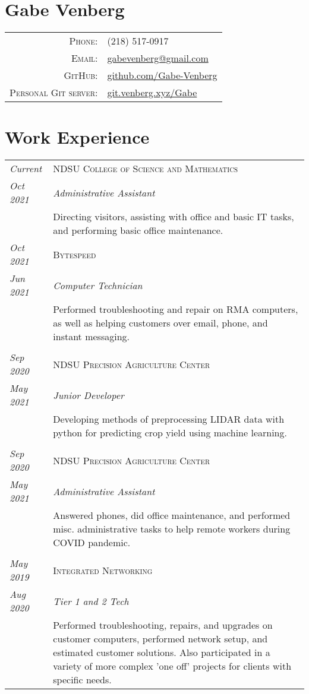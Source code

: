 \documentclass[letterpaper,10pt]{article}
\begin{document}
\pagestyle{empty}%
\section*{Gabe Venberg}
	\begin{tabular}{rl}
	\textsc{Phone:} & (218) 517-0917\\
	\textsc{Email:} & \href{mailto:gabevenberg@gmail.com}{gabevenberg@gmail.com}\\
	\textsc{GitHub:} & \href{https://github.com/Gabe-Venberg}{github.com/Gabe-Venberg}\\
	\textsc{Personal Git server:} & \href{https://git.venberg.xyz/Gabe}{git.venberg.xyz/Gabe}\\
	\end{tabular}
\section*{Work Experience}
	\begin{tabular}{R{2cm}|p{14cm}}
	\textsl{Current}	&\textsc{NDSU College of Science and Mathematics}\\
	\textsl{Oct 2021}	&\emph{Administrative Assistant}\\
	& Directing visitors, assisting with office and basic IT tasks, and performing basic office maintenance.\\
	\textsl{Oct 2021}	& \textsc{Bytespeed}\\
	\textsl{Jun 2021}	& \emph{Computer Technician}\\
	& Performed troubleshooting and repair on RMA computers, as well as helping customers over email, phone, and instant messaging.\\
	\\
	\textsl{Sep 2020}	& \textsc{NDSU Precision Agriculture Center}\\
	\textsl{May 2021}	& \emph{Junior Developer}\\
	& Developing methods of preprocessing LIDAR data with python for predicting crop yield using machine learning.\\
	\\
	\textsl{Sep 2020}	& \textsc{NDSU Precision Agriculture Center}\\
	\textsl{May 2021}	& \emph{Administrative Assistant}\\
	& Answered phones, did office maintenance, and performed misc. administrative tasks to help remote workers during COVID pandemic.\\
	\\
	\textsl{May 2019}	& \textsc{Integrated Networking}\\
	\textsl{Aug 2020}	& \emph{Tier 1 and 2 Tech}\\
	& Performed troubleshooting, repairs, and upgrades on customer computers, performed network setup, and estimated customer solutions.
	Also participated in a variety of more complex 'one off' projects for clients with specific needs.\\
	\end{tabular}
\end{document}
